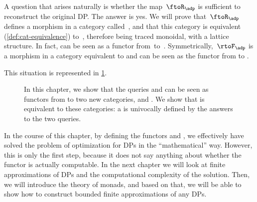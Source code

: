 A question that arises naturally is whether the map~$\ftoR_\adp$ is sufficient to reconstruct the original DP.
The answer is yes.
We will prove that~$\ftoR_\adp$ defines a morphism in a category called~\UPos, and that this category is equivalent (\cref{def:cat-equivalence}) to~\DP, therefore being traced monoidal, with a lattice structure.
In fact, \FixFunMinRes can be seen as a functor from~\DP to~\UPos.
Symmetrically,~$\rtoF_\adp$ is a morphism in a category \LPos equivalent to \DP and \FixResMaxFun can be seen as the functor from \DP to \LPos.

This situation is represented in \cref{fig:upos_lpos_dp}.

\begin{figure}[tbh]
    \centering
    \caption{In this chapter, we show that the queries \FixResMaxFun and \FixFunMinRes
    can be seen as functors from \DP to two new categories, \UPos and \LPos. 
    We show that \DP is equivalent to these categories: a \DP is univocally
    defined by the answers to the two queries.}
    \label{fig:upos_lpos_dp}
\end{figure}

In the course of this chapter, by defining the functors \FixFunMinRes
and \FixResMaxFun, we effectively have solved the problem of optimization for DPs in the ``mathematical'' way. 
However, this is only the first step, because it does not say anything about whether the functor is actually computable. In the next chapter  we will look at finite approximations of DPs and the computational complexity of the solution.
Then, we will introduce the theory of monads, and based on that, we will be able to show how to construct bounded finite approximations of any DPs.
